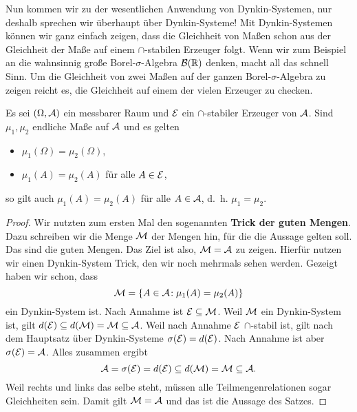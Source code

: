 Nun kommen wir zu der wesentlichen Anwendung von Dynkin-Systemen, nur deshalb sprechen wir \"uberhaupt \"uber Dynkin-Systeme! Mit Dynkin-Systemen k\"onnen wir ganz einfach zeigen, dass die Gleichheit von Ma\ss en schon aus der Gleichheit der Ma\ss e auf einem $\cap$-stabilen Erzeuger folgt. Wenn wir zum Beispiel an die wahnsinnig gro\ss e Borel-$\sigma$-Algebra $\mathcal B(\mathbb{R})$ denken, macht all das schnell Sinn. Um die Gleichheit von zwei Ma\ss en auf der ganzen Borel-$\sigma$-Algebra zu zeigen reicht es, die Gleichheit auf einem der vielen Erzeuger zu checken.
\begin{satz}\label{Dynkin-Folgerung} 
	Es sei $(\Omega, \mathcal{A})$ ein messbarer Raum und $\mathcal{E}$ ein $\cap$-stabiler Erzeuger von $\mathcal{A}$. Sind $\mu_1,\mu_2$ endliche Maße auf $\mathcal{A}$ und es gelten
	\begin{itemize}
		\item $\mu_1(\Omega)=\mu_2(\Omega)$,
		\item $\mu_1(A) = \mu_2(A)$ für alle $A \in \mathcal{E}$, 
	\end{itemize}
	so gilt auch $\mu_1(A) = \mu_2(A)$ für alle $A \in \mathcal{A}$, \mbox{d. h.} $\mu_1 = \mu_2$.
\end{satz}

\begin{proof} 
Wir nutzten zum ersten Mal den sogenannten \textbf{Trick der guten Mengen}. Dazu schreiben wir die Menge $\mathcal{M}$ der Mengen hin, f\"ur die die Aussage gelten soll. Das sind die guten Mengen. Das Ziel ist also, $\mathcal{M}=\mathcal A$ zu zeigen. Hierf\"ur nutzen wir einen Dynkin-System Trick, den wir noch mehrmals sehen werden. Gezeigt haben wir schon, dass
	\[ \mathcal{M} = \{ A \in \mathcal{A} \! : \mu_1(A) = \mu_2(A) \} \] ein Dynkin-System ist. Nach Annahme ist $\mathcal{E} \subseteq \mathcal{M}$. Weil $\mathcal{M}$ ein Dynkin-System ist, gilt $d(\mathcal{E}) \subseteq d(\mathcal{M}) = \mathcal{M} \subseteq \mathcal{A}$. Weil nach Annahme $\mathcal{E}$ $\cap$-stabil ist, gilt nach dem Hauptsatz \"uber Dynkin-Systeme $\sigma(\mathcal{E}) = d(\mathcal{E})$. Nach Annahme ist aber $\sigma(\mathcal{E}) = \mathcal{A}$. Alles zusammen ergibt \[ \mathcal{A} = \sigma(\mathcal{E}) = d(\mathcal{E}) \subseteq d(\mathcal{M}) = \mathcal{M} \subseteq \mathcal{A}. \] Weil rechts und links das selbe steht, m\"ussen alle Teilmengenrelationen sogar Gleichheiten sein. Damit gilt $\mathcal{M} = \mathcal{A}$ und das ist die Aussage des Satzes.
\end{proof}

